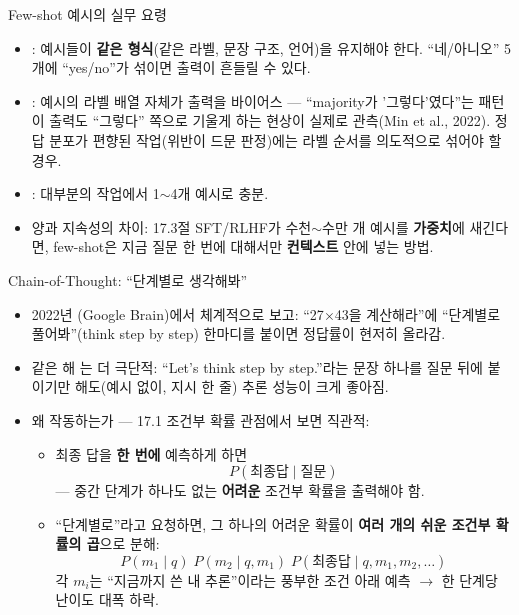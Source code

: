 \documentclass[aspectratio=169,11pt]{beamer}
\begin{document}
\begin{frame}{Few-shot 예시의 실무 요령}
  \begin{itemize}
    \item {}: 예시들이 \textbf{같은 형식}(같은
      라벨, 문장 구조, 언어)을 유지해야 한다. ``네/아니오''
      5개에 ``yes/no''가 섞이면 출력이 흔들릴 수 있다.
    \item {}: 예시의 라벨 배열 자체가
      출력을 바이어스 --- ``majority가 '그렇다'였다''는
      패턴이 출력도 ``그렇다'' 쪽으로 기울게 하는 현상이
      실제로 관측(Min et al., 2022). 정답 분포가 편향된
      작업(위반이 드문 판정)에는 라벨 순서를 의도적으로
      섞어야 할 경우.
    \item {}: 대부분의 작업에서
      1$\sim$4개 예시로 충분.
    \item 양과 지속성의 차이: 17.3절 SFT/RLHF가
      수천$\sim$수만 개 예시를 \textbf{가중치}에 새긴다면,
      few-shot은 지금 질문 한 번에 대해서만
      \textbf{컨텍스트} 안에 넣는 방법.
  \end{itemize}
\end{frame}

\begin{frame}{Chain-of-Thought: ``단계별로 생각해봐''}
  \begin{itemize}
    \item 2022년 (Google Brain)에서 체계적으로
      보고: ``27$\times$43을 계산해라''에 ``단계별로
      풀어봐''(think step by step) 한마디를 붙이면 정답률이
      현저히 올라감.
    \item 같은 해 는 더 극단적: ``Let's
      think step by step.''라는 문장 하나를 질문 뒤에
      붙이기만 해도(예시 없이, 지시 한 줄) 추론 성능이
      크게 좋아짐.
    \item 왜 작동하는가 — 17.1 조건부 확률 관점에서 보면
      직관적:
      \begin{itemize}
        \item 최종 답을 \textbf{한 번에} 예측하게 하면
          \[P(\text{최종답} \mid \text{질문})\]
          --- 중간 단계가 하나도 없는 \textbf{어려운}
          조건부 확률을 출력해야 함.
        \item ``단계별로''라고 요청하면, 그 하나의 어려운
          확률이 \textbf{여러 개의 쉬운 조건부 확률의
          곱}으로 분해:
          \[P(m_1 \mid q) \; P(m_2 \mid q, m_1) \;
          P(\text{최종답} \mid q, m_1, m_2, \ldots)\]
          각 $m_i$는 ``지금까지 쓴 내 추론''이라는 풍부한
          조건 아래 예측 $\to$ 한 단계당 난이도 대폭 하락.
      \end{itemize}
  \end{itemize}
\end{frame}
\end{document}
